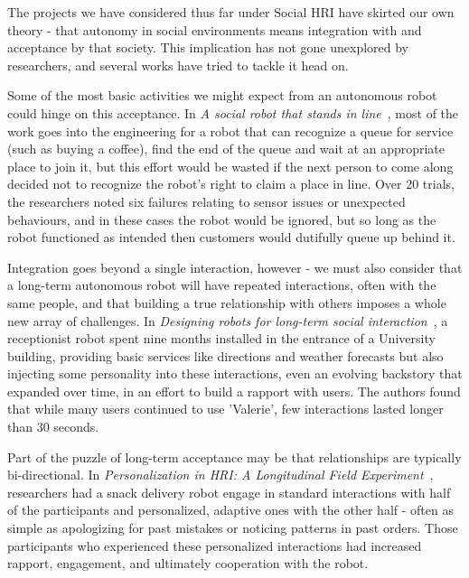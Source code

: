 \documentclass{sfuthesis}
\begin{document}
The projects we have considered thus far under Social HRI have skirted our own theory - that autonomy in social environments means integration with and acceptance by that society. This implication has not gone unexplored by researchers, and several works have tried to tackle it head on.


Some of the most basic activities we might expect from an autonomous robot could hinge on this acceptance. In \textit{A social robot that stands in line}~\cite{nakauchi2002social}, most of the work goes into the engineering for a robot that can recognize a queue for  service (such as buying a coffee), find the end of the queue and wait at an appropriate place to join it, but this effort would be wasted if the next person to come along decided not to recognize the robot's right to claim a place in line. Over 20 trials, the researchers noted six failures relating to sensor issues or unexpected behaviours, and in these cases the robot would be ignored, but so long as the robot functioned as intended then customers would dutifully queue up behind it.

Integration goes beyond a single interaction, however - we must also consider that a long-term autonomous robot will have repeated interactions, often with the same people, and that building a true relationship with others imposes a whole new array of challenges. In \textit{Designing robots for long-term social interaction}~\cite{gockley2005designing}, a receptionist robot spent nine months installed in the entrance of a University building, providing basic services like directions and weather forecasts but also injecting some personality into these interactions, even an evolving backstory that expanded over time, in an effort to build a rapport with users. The authors found that while many users continued to use 'Valerie', few interactions lasted longer than 30 seconds.

Part of the puzzle of long-term acceptance may be that relationships are typically bi-directional. In \textit{Personalization in HRI: A Longitudinal Field Experiment}~\cite{lee2012personalization}, researchers had a snack delivery robot engage in standard interactions with half of the participants and personalized, adaptive ones with the other half - often as simple as apologizing for past mistakes or noticing patterns in past orders. Those participants who experienced these personalized interactions had increased rapport, engagement, and ultimately cooperation with the robot.
\end{document}
